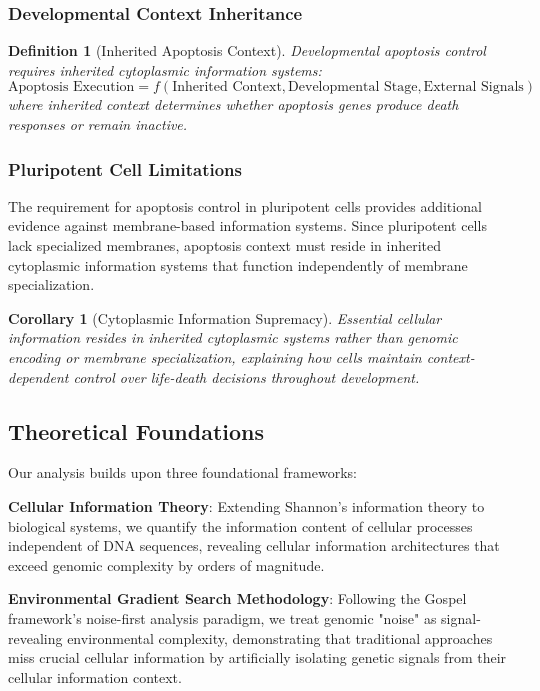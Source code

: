 \documentclass[12pt,a4paper]{article}
\newtheorem{corollary}[theorem]{Corollary}
\newtheorem{definition}[theorem]{Definition}
\begin{document}
\subsubsection{Developmental Context Inheritance}

\begin{definition}[Inherited Apoptosis Context]
Developmental apoptosis control requires inherited cytoplasmic information systems:
\begin{equation}
\text{Apoptosis Execution} = f(\text{Inherited Context}, \text{Developmental Stage}, \text{External Signals})
\end{equation}
where inherited context determines whether apoptosis genes produce death responses or remain inactive.
\end{definition}

\subsubsection{Pluripotent Cell Limitations}

The requirement for apoptosis control in pluripotent cells provides additional evidence against membrane-based information systems. Since pluripotent cells lack specialized membranes, apoptosis context must reside in inherited cytoplasmic information systems that function independently of membrane specialization.

\begin{corollary}[Cytoplasmic Information Supremacy]
Essential cellular information resides in inherited cytoplasmic systems rather than genomic encoding or membrane specialization, explaining how cells maintain context-dependent control over life-death decisions throughout development.
\end{corollary}

\subsection{Theoretical Foundations}

Our analysis builds upon three foundational frameworks:

\textbf{Cellular Information Theory}: Extending Shannon's information theory to biological systems, we quantify the information content of cellular processes independent of DNA sequences, revealing cellular information architectures that exceed genomic complexity by orders of magnitude.

\textbf{Environmental Gradient Search Methodology}: Following the Gospel framework's noise-first analysis paradigm, we treat genomic "noise" as signal-revealing environmental complexity, demonstrating that traditional approaches miss crucial cellular information by artificially isolating genetic signals from their cellular information context.
\end{document}
